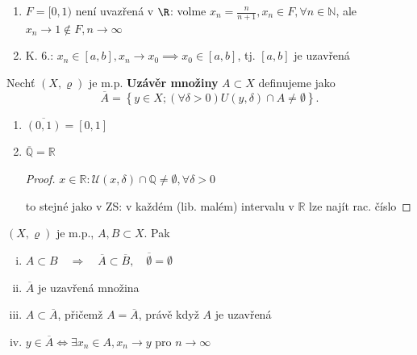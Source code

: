 \begin{priklad}
  \begin{enumerate}[1.]
    \item $F = [0,1)$ není uvazřená v $\mathbb \R$: volme $x_n = \frac{n}{n+1}, x_n \in F, \forall n \in \mathbb N$, ale $x_n \to 1 \notin F, n \to \infty$
    \item K. 6.: $x_n \in [a,b], x_n \to x_0 \implies x_0 \in [a, b]$, tj. $[a,b]$ je uzavřená
  \end{enumerate}
\end{priklad}

\begin{definice}
Nechť $(X,\varrho)$ je m.p. \textbf{Uzávěr množiny} $A \subset X$ definujeme jako
\[
\overline{A} = \left\{y \in X; \left(\forall \delta > 0\right) U(y, \delta) \cap A \neq \emptyset \right\}.
\]
\end{definice}

\begin{priklad}
\begin{enumerate}[1.]
    \item $\overline{(0,1)} = [0,1]$
    \item $\overline{\mathbb{Q}} = \mathbb{R}$
    \begin{proof}
      $x\in \mathbb R: \mathscr U(x, \delta) \cap \mathbb Q \neq \emptyset, \forall \delta >0$

      to stejné jako v ZS: v každém (lib. malém) intervalu v $\mathbb R$ lze najít rac. číslo
    \end{proof}
\end{enumerate}
\end{priklad}

\begin{veta}
$(X,\varrho)$ je m.p., $A, B \subset X$. Pak

\begin{enumerate}[i.]
    \item $A \subset B \quad \Longrightarrow \quad \overline{A} \subset \overline{B}, \quad \overline{\emptyset} = \emptyset$
    \item $\overline{A}$ je uzavřená množina
    \item $A \subset \overline{A}$, přičemž $A = \overline{A}$, právě když $A$ je uzavřená
    \item $y \in \overline{A} \iff \exists x_{n} \in A, x_{n} \to y$ pro $n \to \infty$
\end{enumerate}
\end{veta}

